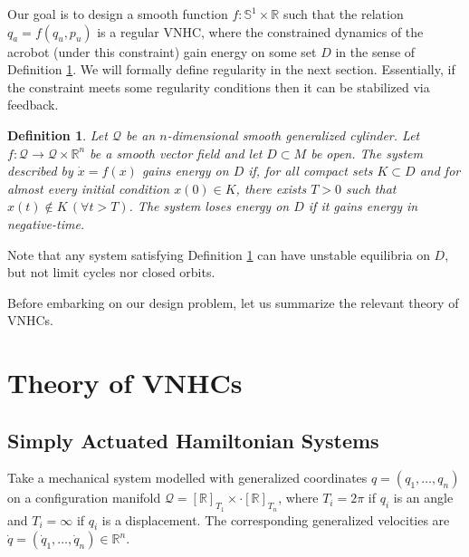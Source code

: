 \documentclass[journal,twoside,web]{ieeecolor}
\newtheorem{defn}[thm]{Definition} %
\newcommand*{\Rt}[1]{[\R]_{#1}}
\newcommand*{\R}{\mathbb{R}}
\newcommand*{\Sone}{\mathbb{S}^1}
\begin{document}
Our goal is to design a smooth function \(f : \Sone \times \R\) such that the
relation \(q_a = f(q_u,p_u)\) is a regular VNHC, where the constrained dynamics
of the acrobot (under this constraint) gain energy on some set \(D\)
in the sense of Definition \ref{defn:energy-gain}.
We will formally define regularity in the next section.
Essentially, if the constraint meets some regularity conditions then it can be
stabilized via feedback.

\begin{defn}\label{defn:energy-gain}
    Let \(\mathcal{Q}\) be an
    \(n\)-dimensional smooth generalized cylinder.
    Let \(f : \mathcal{Q} \rightarrow \mathcal{Q}\times\R^n\) be a smooth vector
    field and let \(D \subset M\) be open.
    The system described by \(\dot{x} = f(x)\) 
    \textit{gains energy on \(D\)} if, 
    for all compact sets \(K \subset D\) and for almost every initial
    condition \(x(0) \in K\), there exists \(T > 0\) such
    that \(x(t) \notin K \, (\forall t > T)\).
    The system \textit{loses energy on \(D\)} if it gains energy in
    negative-time.
\end{defn}

Note that any system satisfying Definition \ref{defn:energy-gain}
can have unstable equilibria on \(D\), but not limit cycles nor closed orbits.

Before embarking on our design problem, let us summarize the relevant theory of
VNHCs.

\section{Theory of VNHCs}\label{sec:vnhc}

\subsection{Simply Actuated Hamiltonian Systems} \label{sec:vnhc-sah}
Take a mechanical system modelled with generalized coordinates 
\(q = (q_1, \ldots, q_n)\) on a configuration manifold
\(\mathcal{Q} = \Rt{T_1} \times \cdot \Rt{T_n}\), where
\(T_i = 2\pi\) if \(q_i\) is an angle and \(T_i = \infty\) if \(q_i\) is a
displacement. The corresponding generalized velocities are 
\(\dot{q} = (\dot{q}_1,\ldots,\dot{q}_n) \in \R^n\).
\end{document}

